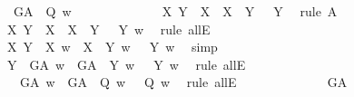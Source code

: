 \begin{isabellebody}
\ {}{\isacharcolon}\ {\isachardoublequoteopen}{\isacharparenleft}G\isactrlsup A\ {\isasymRrightarrow}\ Q{\isacharparenright}\ w{\isachardoublequoteclose}\ %
\isanewline
\ \ \ \ \ \ \ \ \ \ \ \isamarkupfalse%
\ {\isachardoublequoteopen}{\isasymlfloor}\isactrlbold {\isasymforall}X\ Y{\isachardot}\ {\isacharparenleft}{\isasymP}\ X\ \isactrlbold {\isasymand}\ {\isacharparenleft}X\ {\isasymRrightarrow}\ Y{\isacharparenright}{\isacharparenright}\ \isactrlbold {\isasymrightarrow}\ {\isasymP}\ Y{\isasymrfloor}{\isachardoublequoteclose}\ \isamarkupfalse%
\ {\isacharparenleft}rule\ A{}{\isacharparenright}\isanewline
\ \ \ \ \ \ \ \ \ \ \ \isamarkupfalse%
\ {\isachardoublequoteopen}{\isacharparenleft}\isactrlbold {\isasymforall}X\ Y{\isachardot}\ {\isacharparenleft}{\isasymP}\ X\ \isactrlbold {\isasymand}\ {\isacharparenleft}X\ {\isasymRrightarrow}\ Y{\isacharparenright}{\isacharparenright}\ \isactrlbold {\isasymrightarrow}\ {\isasymP}\ Y{\isacharparenright}\ w{\isachardoublequoteclose}\ \isamarkupfalse%
\ {\isacharparenleft}rule\ allE{\isacharparenright}\isanewline
\ \ \ \ \ \ \ \ \ \ \ \isamarkupfalse%
\ {\isachardoublequoteopen}{\isasymforall}X\ Y{\isachardot}\ {\isacharparenleft}{\isasymP}\ X\ w\ {\isasymand}\ {\isacharparenleft}X\ {\isasymRrightarrow}\ Y{\isacharparenright}\ w{\isacharparenright}\ {\isasymlongrightarrow}\ {\isasymP}\ Y\ w{\isachardoublequoteclose}\ \isamarkupfalse%
\ simp\isanewline
\ \ \ \ \ \ \ \ \ \ \ \isamarkupfalse%
\ {\isachardoublequoteopen}{\isasymforall}Y{\isachardot}\ {\isacharparenleft}{\isasymP}\ G\isactrlsup A\ w\ {\isasymand}\ {\isacharparenleft}G\isactrlsup A\ {\isasymRrightarrow}\ Y{\isacharparenright}\ w{\isacharparenright}\ {\isasymlongrightarrow}\ {\isasymP}\ Y\ w{\isachardoublequoteclose}\ \isamarkupfalse%
\ {\isacharparenleft}rule\ allE{\isacharparenright}\isanewline
\ \ \ \ \ \ \ \ \ \ \ \isamarkupfalse%
\ {}{\isacharcolon}\ {\isachardoublequoteopen}{\isacharparenleft}{\isasymP}\ G\isactrlsup A\ w\ {\isasymand}\ {\isacharparenleft}G\isactrlsup A\ {\isasymRrightarrow}\ Q{\isacharparenright}\ w{\isacharparenright}\ {\isasymlongrightarrow}\ {\isasymP}\ Q\ w{\isachardoublequoteclose}\ \isamarkupfalse%
\ {\isacharparenleft}rule\ allE{\isacharparenright}\isanewline
\ \ \ \ \ \ \ \ \ \ \ \isamarkupfalse%
\ {\isachardoublequoteopen}{\isasymlfloor}{\isasymP}\ G\isactrlsup A{\isasymrfloor}{\isachardoublequoteclose}\ \isamarkupfalse%

\end{isabellebody}
